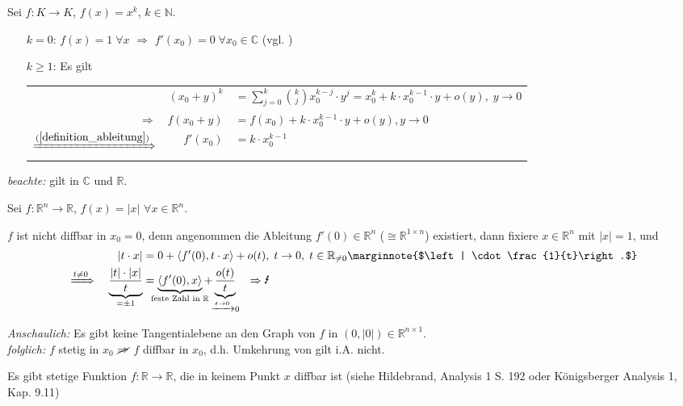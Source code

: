 \begin{example}
	Sei $f:K\to K$, $f(x) = x^k$, $k\in\mathbb{N}$.
	\begin{itemize}[leftmargin=]
		\item[$k=0$:] $f(x) = 1\;\forall x$ $\Rightarrow$ $f'(x_0) = 0\;\forall x_0\in\mathbb{C}$ (vgl. )
		\item[$k\ge 1$:] Es gilt \\
		\renewcommand{\arraystretch}{1.2}
		\begin{tabularx}{\linewidth}{r@{\ \ }r@{$\,$}X}
			& $(x_0 + y)^k$ & $\displaystyle = \sum_{j=0}^{k}\binom{k}{j} x_0^{k-j}\cdot y^j = x_0^k + k\cdot x_0^{k-1}\cdot y + o(y),\;y\to 0$ \\
			$\Rightarrow$ & $f(x_0 + y)$ & $= f(x_0) + k\cdot x_0^{k-1}\cdot y + o(y), y\to 0$ \\
			$\xRightarrow{(\ref{definition_ableitung})}$ & $f'(x_0)$ & $= k\cdot x_0^{k-1}$
		\end{tabularx}
	\end{itemize}
	\emph{beachte:} gilt in $\mathbb{C}$ und $\mathbb{R}$.
\end{example}

\begin{example}
	Sei $f:\mathbb{R}^n\to \mathbb{R}$, $f(x) = \vert x \vert$ $\forall x\in\mathbb{R}^n$.
	
	$f$ ist nicht \gls{diffbar} in $x_0=0$, denn angenommen die Ableitung $f'(0)\in\mathbb{R}^n$ ($\cong \mathbb{R}^{1 \times n}$) existiert, dann fixiere $x\in\mathbb{R}^n$ mit $\vert x \vert = 1$, und
	\begin{alignat*}{2}
		&& \vert t\cdot x\vert &= 0 + \langle f'(0), t\cdot x \rangle + o(t),\;t\to 0,\; t\in\mathbb{R}_{\neq 0} \marginnote{$\left| \cdot \frac{1}{t}\right.$} \\
		\xRightarrow{t\neq 0}\;&& \underbrace{\frac{\vert t \vert \cdot \vert x \vert}{t}}_{=\pm 1} &= \underbrace{\langle f'(0), x\rangle}_{\mathclap{\text{feste Zahl in $\mathbb{R}$}}} + \underbrace{\frac{o(t)}{t}}_{\mathclap{\xrightarrow{t\to 0}0}} \quad\Rightarrow \text{\Lightning}
	\end{alignat*}
	
	\emph{Anschaulich:} Es gibt keine Tangentialebene an den Graph von $f$ in $(0, \vert 0 \vert )\in\mathbb{R}^{n\times 1}$.\\
	\emph{folglich:} $f$ stetig in $x_0$ $\cancel{\Rightarrow}$ $f$ \gls{diffbar} in $x_0$, d.h. Umkehrung von  gilt i.A. nicht.
	
	\begin{hint}
		Es gibt stetige Funktion $f:\mathbb{R}\to \mathbb{R}$, die in keinem Punkt $x$ \gls{diffbar} ist (siehe Hildebrand, Analysis 1 S. 192 oder Königsberger Analysis 1, Kap. 9.11)
	\end{hint}
\end{example}

